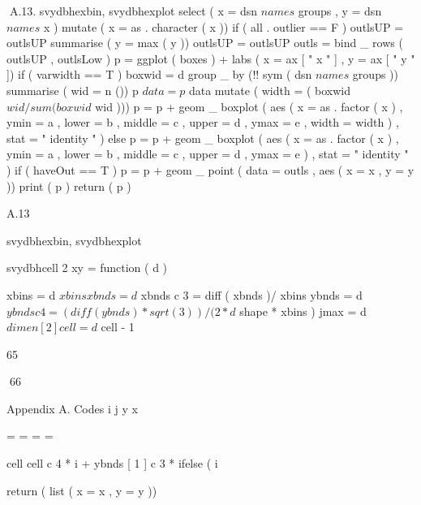 {{{A.13. svydbhexbin, svydbhexplot
select ( x = dsn $ names $ groups ,
y = dsn $ names $ x ) %
mutate ( x = as . character ( x ))
if ( all . outlier == F ) {
outlsUP = outlsUP %
summarise ( y = max ( y ))
}
outlsUP = outlsUP %
}
outls = bind _ rows ( outlsUP , outlsLow )
}
p = ggplot ( boxes ) + labs ( x = ax [ " x " ] , y = ax [ " y " ])
if ( varwidth == T ) {
boxwid = d %
group _ by (!! sym ( dsn $ names $ groups )) %
summarise ( wid = n ()) %
p $ data = p $ data %
mutate ( width = ( boxwid $ wid / sum ( boxwid $ wid )))
p = p + geom _ boxplot ( aes ( x = as . factor ( x ) ,
ymin = a , lower = b , middle = c , upper = d ,
ymax = e , width = width ) , stat = " identity " )
} else {
p = p + geom _ boxplot ( aes ( x = as . factor ( x ) ,
ymin = a , lower = b , middle = c , upper = d ,
ymax = e ) , stat = " identity " )
}
if ( haveOut == T ) {
p = p + geom _ point ( data = outls , aes ( x = x ,
y = y ))
}
print ( p )
return ( p )
}

A.13

svydbhexbin, svydbhexplot

svydbhcell 2 xy = function ( d ) {
xbins = d $ xbins
xbnds = d $ xbnds
c 3 = diff ( xbnds )/ xbins
ybnds = d $ ybnds
c 4 = ( diff ( ybnds ) * sqrt ( 3 ))/( 2 * d $ shape *
xbins )
jmax = d $ dimen [ 2 ]
cell = d $ cell - 1

65

66

Appendix A. Codes
i
j
y
x

=
=
=
=

cell %
cell %
c 4 * i + ybnds [ 1 ]
c 3 * ifelse ( i %

return ( list ( x = x , y = y ))
}

